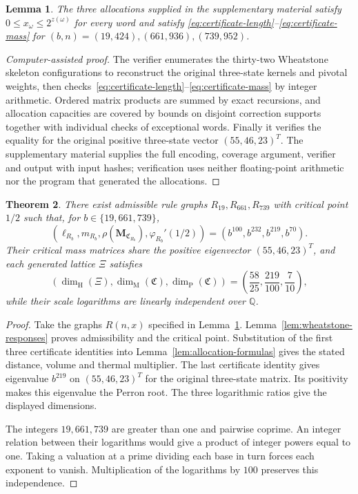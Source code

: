 \documentclass[scheme=plain,11pt]{ctexart}
\newtheorem{theorem}{Theorem}[section]
\newtheorem{lemma}[theorem]{Lemma}
\theoremstyle{definition}
\theoremstyle{remark}
\begin{document}
\begin{lemma}\label{lem:integer-certificates}
The three allocations supplied in the supplementary material satisfy
$0\le x_\omega\le2^{z(\omega)}$ for every word and satisfy
\eqref{eq:certificate-length}--\eqref{eq:certificate-mass} for
$(b,n)=(19,424),(661,936),(739,952)$.
\end{lemma}
\begin{proof}[Computer-assisted proof]
The verifier enumerates the thirty-two Wheatstone skeleton configurations to reconstruct the original three-state kernels and pivotal weights, then checks~\eqref{eq:certificate-length}--\eqref{eq:certificate-mass} by integer arithmetic.
Ordered matrix products are summed by exact recursions, and allocation capacities are covered by bounds on disjoint correction supports together with individual checks of exceptional words.
Finally it verifies the equality for the original positive three-state vector $(55,46,23)^T$.
The supplementary material supplies the full encoding, coverage argument, verifier and output with input hashes; verification uses neither floating-point arithmetic nor the program that generated the allocations.
\end{proof}

\begin{theorem}\label{thm:incommensurate-class}
There exist admissible rule graphs $R_{19},R_{661},R_{739}$ with critical point $1/2$ such that, for $b\in\{19,661,739\}$,
\[
 (\ell_{R_b},m_{R_b},\rho(\mathbf M_{\mathfrak C_{R_b}}),\varphi_{R_b}'(1/2))
 =(b^{100},b^{232},b^{219},b^{70}).
\]
Their critical mass matrices share the positive eigenvector $(55,46,23)^T$, and each generated lattice $\Xi$ satisfies
\[
 (\dim_{\mathrm H}(\Xi),\dim_{\mathrm M}(\mathfrak C),\dim_{\mathrm P}(\mathfrak C))
 =\left(\frac{58}{25},\frac{219}{100},\frac7{10}\right),
\]
while their scale logarithms are linearly independent over $\mathbb Q$.
\end{theorem}
\begin{proof}
Take the graphs $R(n,x)$ specified in Lemma~\ref{lem:integer-certificates}. Lemma~\ref{lem:wheatstone-responses} proves admissibility and the critical point. Substitution of the first three certificate identities into Lemma~\ref{lem:allocation-formulas} gives the stated distance, volume and thermal multiplier. The last certificate identity gives eigenvalue $b^{219}$ on $(55,46,23)^T$ for the original three-state matrix. Its positivity makes this eigenvalue the Perron root. The three logarithmic ratios give the displayed dimensions.

The integers $19,661,739$ are greater than one and pairwise coprime. An integer relation between their logarithms would give a product of integer powers equal to one. Taking a valuation at a prime dividing each base in turn forces each exponent to vanish. Multiplication of the logarithms by $100$ preserves this independence.
\end{proof}
\end{document}
